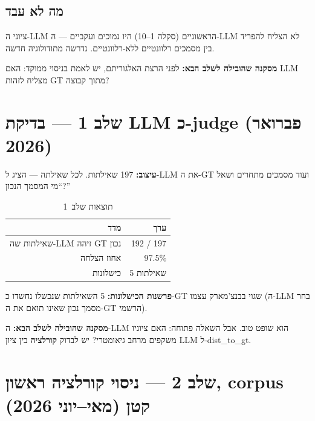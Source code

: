 \documentclass[12pt, a4paper]{article}
\begin{document}
\subsection{מה לא עבד}
ציוני ה-\textenglish{LLM} הראשוניים (סקלה 1--10) היו נמוכים ועקביים --- ה-\textenglish{LLM} לא הצליח להפריד בין מסמכים רלוונטיים ללא-רלוונטיים. נדרשה מתודולוגיה חדשה.

\textbf{מסקנה שהובילה לשלב הבא:} לפני הרצת האלגוריתם, יש לאמת בניסוי ממוקד: האם \textenglish{LLM} מצליח לזהות \textenglish{GT} מתוך קבוצה?

\section{שלב 1 --- בדיקת LLM כ-judge (פברואר 2026)}

\textbf{עיצוב:} 197 שאילתות. לכל שאילתה --- הציג ל-\textenglish{LLM} את ה-\textenglish{GT} ועוד מסמכים מתחרים ושאל ``מי המסמך הנכון?''

\begin{table}[H]
\centering
\caption{תוצאות שלב~1}
\begin{tabular}{rr}
\toprule
\textbf{מדד} & \textbf{ערך} \\
\midrule
שאילתות שה-\textenglish{LLM} זיהה \textenglish{GT} נכון & 192 / 197 \\
אחוז הצלחה & 97.5\% \\
כישלונות & 5 שאילתות \\
\bottomrule
\end{tabular}
\end{table}

\textbf{פרשנות הכישלונות:} 5 השאילתות שנכשלו נחשדו כ-\textenglish{GT} שגוי בבנצ'מארק עצמו (ה-\textenglish{LLM} בחר מסמך נכון שאינו תואם את ה-\textenglish{GT} הרשמי).

\textbf{מסקנה שהובילה לשלב הבא:} ה-\textenglish{LLM} הוא שופט טוב. אבל השאלה פתוחה: האם ציוניו משקפים מרחב גיאומטרי? יש לבדוק \textbf{קורלציה} בין ציון \textenglish{LLM} ל-\textenglish{dist\_to\_gt}.

\section{שלב 2 --- ניסוי קורלציה ראשון, corpus קטן (מאי--יוני 2026)}
\end{document}
